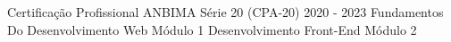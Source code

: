 \begin{cvhonors}
  \cvhonor
    {Certificação Profissional ANBIMA Série 20}
    {(CPA-20)}
    {2020 - 2023}
    {}
  \cvhonor
    {Fundamentos Do Desenvolvimento Web}
    {Módulo 1}
    {}
    {}
  \cvhonor
    {Desenvolvimento Front-End}
    {Módulo 2}
    {}
    {}
\end{cvhonors}

\vspace{.5cm}